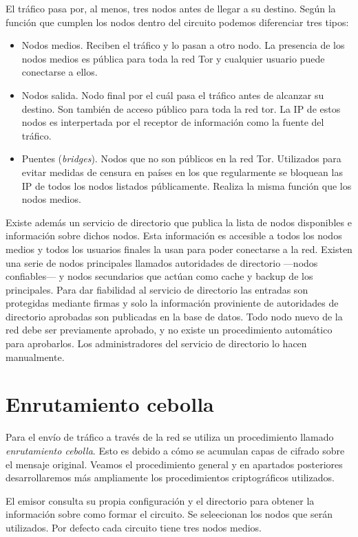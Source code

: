 \documentclass[
  a4paper,
  12pt,
  spanish,
]{scrartcl}
\begin{document}
El tráfico pasa por, al menos, tres nodos antes de llegar a su destino. Según la función que cumplen los nodos dentro del circuito podemos diferenciar tres tipos:

\begin{itemize}
\item Nodos medios. Reciben el tráfico y lo pasan a otro nodo. La presencia de los nodos medios es pública para toda la red Tor y cualquier usuario puede conectarse a ellos.
\item Nodos salida. Nodo final por el cuál pasa el tráfico antes de alcanzar su destino. Son también de acceso público para toda la red tor. La IP de estos nodos es interpertada por el receptor de información como la fuente del tráfico.
\item Puentes (\textit{bridges}). Nodos que no son públicos en la red Tor. Utilizados para evitar medidas de censura en países en los que regularmente se bloquean las IP de todos los nodos listados públicamente. Realiza la misma función que los nodos medios.
\end {itemize}

Existe además un servicio de directorio que publica la lista de nodos disponibles e información sobre dichos nodos. Esta información es accesible a todos los nodos medios y todos los usuarios finales la usan para poder conectarse a la red. Existen una serie de nodos principales llamados autoridades de directorio ---nodos confiables--- y nodos secundarios que actúan como cache y backup de los principales. Para dar fiabilidad al servicio de directorio las entradas son protegidas mediante firmas y solo la información proviniente de autoridades de directorio aprobadas son publicadas en la base de datos. Todo nodo nuevo de la red debe ser previamente aprobado, y no existe un procedimiento automático para aprobarlos. Los administradores del servicio de directorio lo hacen manualmente.

\section{Enrutamiento cebolla}

Para el envío de tráfico a través de la red se utiliza un procedimiento llamado \textit{enrutamiento cebolla}. Esto es debido a cómo se acumulan capas de cifrado sobre el mensaje original. Veamos el procedimiento general y en apartados posteriores desarrollaremos más ampliamente los procedimientos criptográficos utilizados.

El emisor consulta su propia configuración y el directorio para obtener la información sobre como formar el circuito. Se seleecionan los nodos que serán utilizados. Por defecto cada circuito tiene tres nodos medios.
\end{document}
